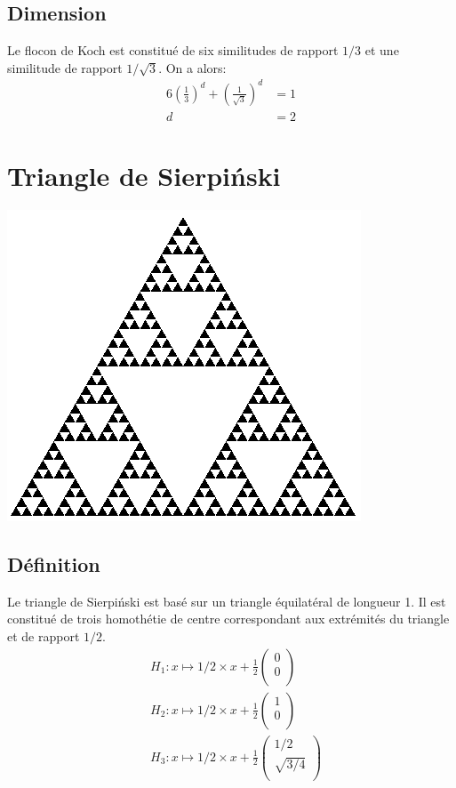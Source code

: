 \documentclass[a4paper, 12pt]{report}
\begin{document}
			\subsection{Dimension}
				Le flocon de Koch est constitué de six similitudes de rapport $1/3$ et une similitude de rapport $1/\sqrt{3}$. On a alors:
				\begin{align*}
					 6\left(\frac{1}{3}\right)^d+\left(\frac{1}{\sqrt{3}}\right)^d	&=1\\
																				d	&=2
				\end{align*}
\newpage
		\section{Triangle de Sierpiński}
			\begin{center}
				\includegraphics[scale=0.7]{Images/triangle}
			\end{center}
			\subsection{Définition}
				Le triangle de Sierpiński est basé sur un triangle équilatéral de longueur 1. Il est constitué de trois homothétie de centre correspondant aux extrémités du triangle et de rapport $1/2$.
				\begin{align*}
					&H_1:x\mapsto 1/2\times x+\frac{1}{2}\left(	\begin{array}{ccc}
															0\\
															0\\
														\end{array}\right)\\
					&H_2:x\mapsto 1/2\times x+\frac{1}{2}\left(	\begin{array}{ccc}
															1\\
															0\\
														\end{array}\right)\\
					&H_3:x\mapsto 1/2\times x+\frac{1}{2}\left(	\begin{array}{ccc}
															1/2\\
															\sqrt{3/4}\\
														\end{array}\right)
				\end{align*}
\end{document}

